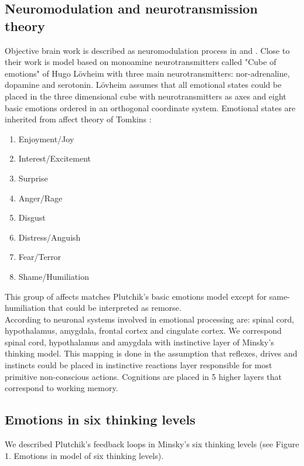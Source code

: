 \subsection{Neuromodulation and neurotransmission theory}

Objective brain work is described as neuromodulation process in \cite{neuromodulatory} and \cite{emotionsbraintorobot}.
Close to their work is model based on monoamine neurotransmitters called "Cube of emotions" of Hugo L\"{o}vheim \cite{cubeofemotions} with three main neurotransmitters: nor-adrenaline, dopamine and serotonin. L\"{o}vheim assumes that all emotional states could be placed in the three dimensional cube with neurotransmitters as axes and eight basic emotions ordered in an orthogonal coordinate system. Emotional states are inherited from affect theory of Tomkins \cite{tomkins1, tomkins2, tomkins3}:

\begin{enumerate}
\item  Enjoyment/Joy
\item  Interest/Excitement
\item  Surprise
\item  Anger/Rage
\item  Disgust
\item  Distress/Anguish
\item  Fear/Terror
\item  Shame/Humiliation
\end{enumerate}

This group of affects matches  Plutchik's basic emotions model except for same-humiliation that could be interpreted as remorse.\\
According to \cite{emotionsbraintorobot} neuronal systems involved in emotional processing are: spinal cord, hypothalamus, amygdala, frontal cortex and cingulate cortex. We correspond spinal cord, hypothalamus and amygdala with instinctive layer of Minsky's thinking model. This mapping is done in the assumption that reflexes, drives and instincts could be placed in instinctive reactions layer responsible for most primitive non-conscious actions. Cognitions are placed in 5 higher layers that correspond to working memory.

\subsection{Emotions in six thinking levels}

We described Plutchik's feedback loops \cite{natureofemotions} in Minsky's six thinking levels (see Figure 1. Emotions in model of six thinking levels).

